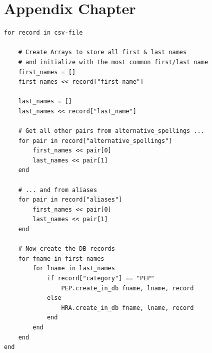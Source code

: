 \documentclass[a4paper, oneside]{csthesis}
\begin{document}



\appendix
\chapter{Appendix Chapter}

\begin{lstlisting}[caption={The Algorithm that parses the csv file creates a separate DB record for each first/last name pair},label={lst:world-check-parse}]
for record in csv-file

    # Create Arrays to store all first & last names
    # and initialize with the most common first/last name
    first_names = []
    first_names << record["first_name"]

    last_names = []
    last_names << record["last_name"]

    # Get all other pairs from alternative_spellings ...
    for pair in record["alternative_spellings"]
        first_names << pair[0]
        last_names << pair[1]
    end

    # ... and from aliases
    for pair in record["aliases"]
        first_names << pair[0]
        last_names << pair[1]
    end

    # Now create the DB records
    for fname in first_names
        for lname in last_names
            if record["category"] == "PEP"
                PEP.create_in_db fname, lname, record
            else
                HRA.create_in_db fname, lname, record
            end
        end
    end
end
\end{lstlisting}
\end{document}
